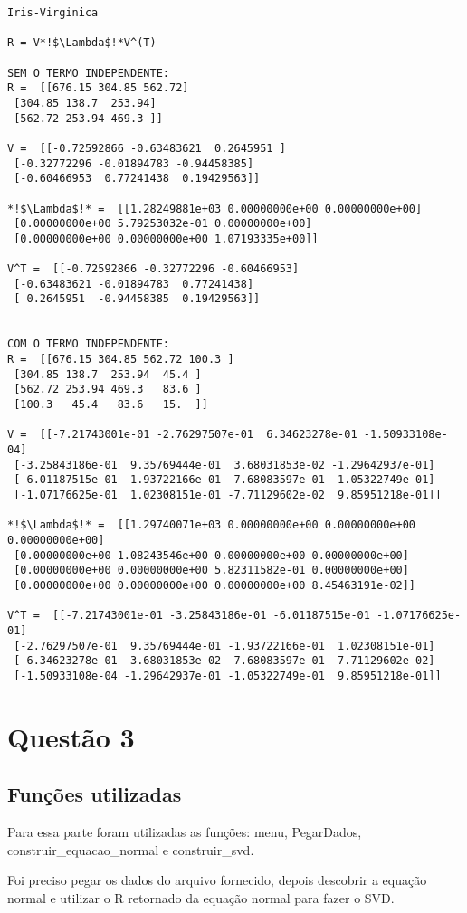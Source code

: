 \documentclass[a4paper,12pt,twoside]{article}
\begin{document}
\begin{lstlisting}
Iris-Virginica

R = V*!$\Lambda$!*V^(T)

SEM O TERMO INDEPENDENTE: 
R =  [[676.15 304.85 562.72]
 [304.85 138.7  253.94]
 [562.72 253.94 469.3 ]]

V =  [[-0.72592866 -0.63483621  0.2645951 ]
 [-0.32772296 -0.01894783 -0.94458385]
 [-0.60466953  0.77241438  0.19429563]]

*!$\Lambda$!* =  [[1.28249881e+03 0.00000000e+00 0.00000000e+00]
 [0.00000000e+00 5.79253032e-01 0.00000000e+00]
 [0.00000000e+00 0.00000000e+00 1.07193335e+00]]

V^T =  [[-0.72592866 -0.32772296 -0.60466953]
 [-0.63483621 -0.01894783  0.77241438]
 [ 0.2645951  -0.94458385  0.19429563]]


COM O TERMO INDEPENDENTE: 
R =  [[676.15 304.85 562.72 100.3 ]
 [304.85 138.7  253.94  45.4 ]
 [562.72 253.94 469.3   83.6 ]
 [100.3   45.4   83.6   15.  ]]

V =  [[-7.21743001e-01 -2.76297507e-01  6.34623278e-01 -1.50933108e-04]
 [-3.25843186e-01  9.35769444e-01  3.68031853e-02 -1.29642937e-01]
 [-6.01187515e-01 -1.93722166e-01 -7.68083597e-01 -1.05322749e-01]
 [-1.07176625e-01  1.02308151e-01 -7.71129602e-02  9.85951218e-01]]

*!$\Lambda$!* =  [[1.29740071e+03 0.00000000e+00 0.00000000e+00 0.00000000e+00]
 [0.00000000e+00 1.08243546e+00 0.00000000e+00 0.00000000e+00]
 [0.00000000e+00 0.00000000e+00 5.82311582e-01 0.00000000e+00]
 [0.00000000e+00 0.00000000e+00 0.00000000e+00 8.45463191e-02]]

V^T =  [[-7.21743001e-01 -3.25843186e-01 -6.01187515e-01 -1.07176625e-01]
 [-2.76297507e-01  9.35769444e-01 -1.93722166e-01  1.02308151e-01]
 [ 6.34623278e-01  3.68031853e-02 -7.68083597e-01 -7.71129602e-02]
 [-1.50933108e-04 -1.29642937e-01 -1.05322749e-01  9.85951218e-01]]
\end{lstlisting}

\section{Questão 3}
\subsection{Funções utilizadas}
    Para essa parte foram utilizadas as funções: menu, PegarDados, construir\_equacao\_normal e construir\_svd.
    
Foi preciso pegar os dados do arquivo fornecido, depois descobrir a equação normal e utilizar o R retornado da equação normal para fazer o SVD.
\end{document}
